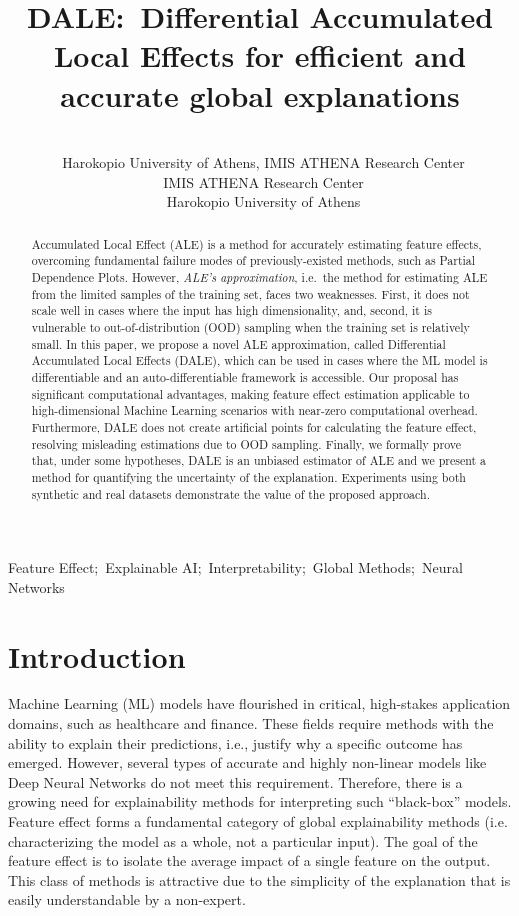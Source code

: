 \documentclass[wcp]{jmlr}
\title[DALE:~Differential Accumulated Local Effects]{DALE:~Differential Accumulated Local Effects for efficient and accurate global explanations}
\author{\Name{Vasilis Gkolemis} \Email{gkolemis@hua.gr, vgkolemis@athenarc.gr}\\
  \addr~Harokopio University of Athens, IMIS ATHENA Research Center
  \AND
  \Name{Theodore Dalamagas} \Email{dalamag@athenarc.gr}\\
  \addr~IMIS ATHENA Research Center
  \AND
  \Name{Christos Diou} \Email{diou@hua.gr}\\
  \addr~Harokopio University of Athens
}
\begin{document}
\maketitle

\begin{abstract}
Accumulated Local Effect (ALE) is a method for accurately estimating feature effects, overcoming fundamental failure modes of previously-existed methods, such as Partial Dependence Plots. However, \textit{ALE's approximation}, i.e.~the method for estimating ALE from the limited samples of the training set, faces two weaknesses. First, it does not scale well in cases where the input has high dimensionality, and, second, it is vulnerable to out-of-distribution (OOD) sampling when the training set is relatively small. In this paper, we propose a novel ALE approximation, called Differential Accumulated Local Effects (DALE), which can be used in cases where the ML model is differentiable and an auto-differentiable framework is accessible. Our proposal has significant computational advantages, making feature effect estimation applicable to high-dimensional Machine Learning scenarios with near-zero computational overhead. Furthermore, DALE does not create artificial points for calculating the feature effect, resolving misleading estimations due to OOD sampling. Finally, we formally prove that, under some hypotheses, DALE is an unbiased estimator of ALE and we present a method for quantifying the uncertainty of the explanation. Experiments using both synthetic and real datasets demonstrate the value of the proposed approach.
\end{abstract}
\begin{keywords}
Feature Effect;~Explainable AI;~Interpretability;~Global Methods;~Neural Networks
\end{keywords}

\section{Introduction}
\label{sec:1-introduction}

Machine Learning (ML) models have flourished in critical, high-stakes application domains, such as healthcare and finance. These fields require methods with the ability to explain their predictions, i.e., justify why a specific outcome has emerged. However, several types of accurate and highly non-linear models like Deep Neural Networks do not meet this requirement. Therefore, there is a growing need for explainability methods for interpreting such ``black-box'' models. Feature effect forms a fundamental category of global explainability methods (i.e. characterizing the model as a whole, not a particular input). The goal of the feature effect is to isolate the average impact of a single feature on the output. This class of methods is attractive due to the simplicity of the explanation that is easily understandable by a non-expert.
\end{document}
